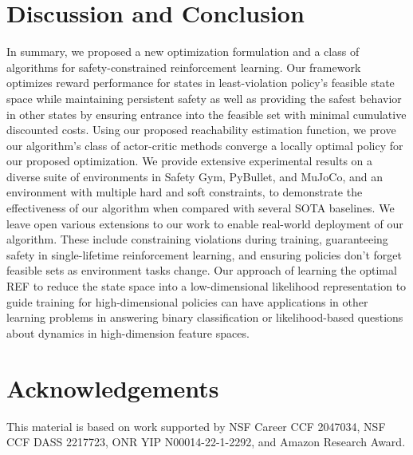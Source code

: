 \documentclass{article}
\theoremstyle{definition}
\begin{document}
\section{Discussion and Conclusion}
In summary, we proposed a new optimization formulation and a class of algorithms for safety-constrained reinforcement learning. Our framework optimizes reward performance for states in least-violation policy's feasible state space while maintaining persistent safety as well as providing the safest behavior in other states by ensuring entrance into the feasible set with minimal cumulative discounted costs. Using our proposed reachability estimation function, we prove our algorithm's class of actor-critic methods converge a locally optimal policy for our proposed optimization. We provide extensive experimental results on a diverse suite of environments in Safety Gym, PyBullet, and MuJoCo, and an environment with multiple hard and soft constraints, to demonstrate the effectiveness of our algorithm when compared with several SOTA baselines. 
We leave open various extensions to our work to enable real-world deployment of our algorithm. These include constraining violations during training, guaranteeing safety in single-lifetime reinforcement learning, and ensuring policies don't forget feasible sets as environment tasks change. Our approach of learning the optimal REF to reduce the state space into a low-dimensional likelihood representation to guide training for high-dimensional policies can have applications in other learning problems in answering binary classification or likelihood-based questions about dynamics in high-dimension feature spaces. 


\section{Acknowledgements}
This material is based on work supported by NSF Career CCF 2047034, NSF CCF DASS 2217723, ONR YIP N00014-22-1-2292, and Amazon Research Award.
\end{document}
